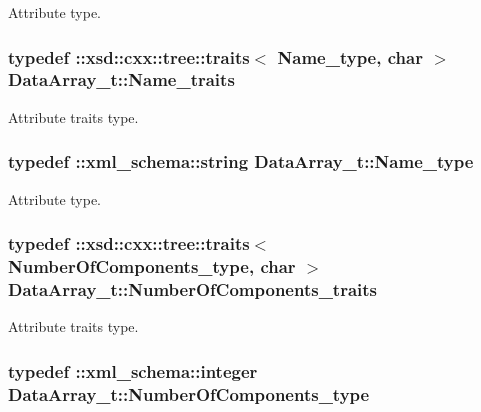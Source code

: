 Attribute type. 

\hypertarget{classDataArray__t_a46d0b4cf44ee9122e4cbb3bd3abe6663}{
\subsubsection[{Name\-\_\-traits}]{\setlength{\rightskip}{0pt plus 5cm}typedef \-::xsd\-::cxx\-::tree\-::traits$<$ {\bf Name\-\_\-type}, char $>$ {\bf Data\-Array\-\_\-t\-::\-Name\-\_\-traits}}}\label{classDataArray__t_a46d0b4cf44ee9122e4cbb3bd3abe6663}


Attribute traits type. 

\hypertarget{classDataArray__t_afc6836923916c2489f91caea78ec4ad6}{
\subsubsection[{Name\-\_\-type}]{\setlength{\rightskip}{0pt plus 5cm}typedef \-::{\bf xml\-\_\-schema\-::string} {\bf Data\-Array\-\_\-t\-::\-Name\-\_\-type}}}\label{classDataArray__t_afc6836923916c2489f91caea78ec4ad6}


Attribute type. 

\hypertarget{classDataArray__t_a1112148f87db2c0ba05323377d9f0427}{
\subsubsection[{Number\-Of\-Components\-\_\-traits}]{\setlength{\rightskip}{0pt plus 5cm}typedef \-::xsd\-::cxx\-::tree\-::traits$<$ {\bf Number\-Of\-Components\-\_\-type}, char $>$ {\bf Data\-Array\-\_\-t\-::\-Number\-Of\-Components\-\_\-traits}}}\label{classDataArray__t_a1112148f87db2c0ba05323377d9f0427}


Attribute traits type. 

\hypertarget{classDataArray__t_aac602cec132f6e771f7fa3be1d19c16f}{
\subsubsection[{Number\-Of\-Components\-\_\-type}]{\setlength{\rightskip}{0pt plus 5cm}typedef \-::{\bf xml\-\_\-schema\-::integer} {\bf Data\-Array\-\_\-t\-::\-Number\-Of\-Components\-\_\-type}}}\label{classDataArray__t_aac602cec132f6e771f7fa3be1d19c16f}


